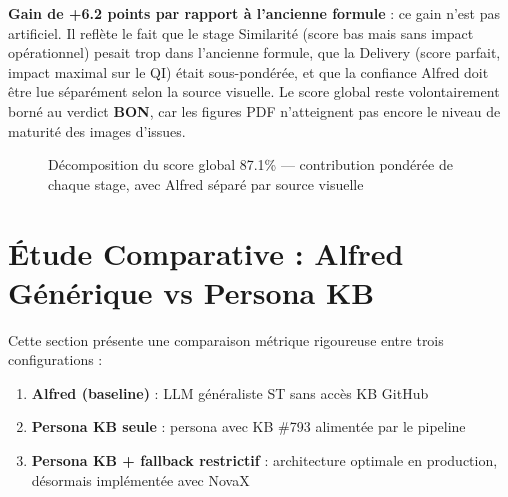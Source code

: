 \documentclass[12pt,a4paper]{report}
\begin{document}
\textbf{Gain de +6.2 points par rapport à l'ancienne formule} : ce gain n'est pas artificiel. Il reflète le fait que le stage Similarité (score bas mais sans impact opérationnel) pesait trop dans l'ancienne formule, que la Delivery (score parfait, impact maximal sur le QI) était sous-pondérée, et que la confiance Alfred doit être lue séparément selon la source visuelle. Le score global reste volontairement borné au verdict \textbf{BON}, car les figures PDF n'atteignent pas encore le niveau de maturité des images d'issues.

\begin{figure}[H]
\centering
{}
\caption{Décomposition du score global 87.1\% --- contribution pondérée de chaque stage, avec Alfred séparé par source visuelle}
\label{fig:score_decomposition_dead}
\end{figure}

\section{Étude Comparative : Alfred Générique vs Persona KB}
\label{sec:comparative_study}

Cette section présente une comparaison métrique rigoureuse entre trois configurations :
\begin{enumerate}
  \item \textbf{Alfred (baseline)} : LLM généraliste ST sans accès KB GitHub
  \item \textbf{Persona KB seule} : persona avec KB \#793 alimentée par le pipeline
  \item \textbf{Persona KB + fallback restrictif} : architecture optimale en production, désormais implémentée avec NovaX
\end{enumerate}
\end{document}
